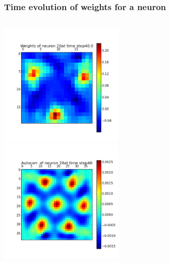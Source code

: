 \begin{frame}
\frametitle{Time evolution of weights for a neuron}
\begin{columns}[t]
\centering
\includegraphics[width=6cm,height=6cm]{neurons/neuron_w_20_t_40.png}\\
\centering
\includegraphics[width=6cm,height=6cm]{neurons/neuron_a_20_t_40.png}\\
\end{columns}
\end{frame}

